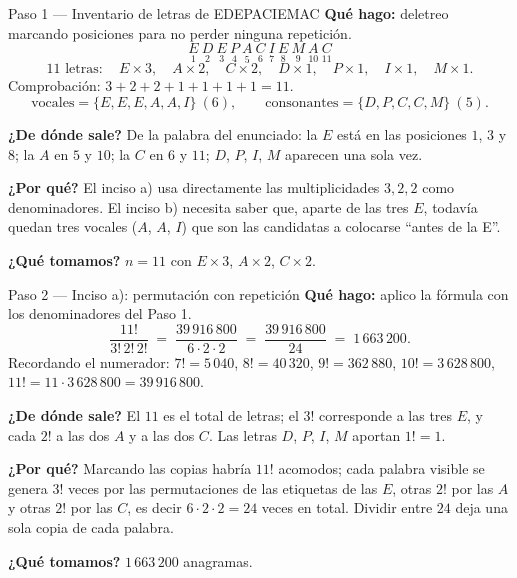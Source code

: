 \documentclass[11pt]{article}
\begin{document}
\begin{paso}{Paso 1 --- Inventario de letras de EDEPACIEMAC}
\textbf{Qué hago:} deletreo marcando posiciones para no perder ninguna repetición.
\[
\underset{1}{E}\ \underset{2}{D}\ \underset{3}{E}\ \underset{4}{P}\ \underset{5}{A}\ \underset{6}{C}\
\underset{7}{I}\ \underset{8}{E}\ \underset{9}{M}\ \underset{10}{A}\ \underset{11}{C}
\]
\[
11 \text{ letras}:\quad E\times 3,\quad A\times 2,\quad C\times 2,\quad D\times 1,\quad P\times 1,\quad
I\times 1,\quad M\times 1 .
\]
Comprobación: $3+2+2+1+1+1+1=11$. \checkmark
\[
\text{vocales} = \{E,E,E,A,A,I\}\ (6),\qquad \text{consonantes} = \{D,P,C,C,M\}\ (5).
\]

\textbf{¿De dónde sale?} De la palabra del enunciado: la $E$ está en las posiciones $1$, $3$ y $8$; la $A$ en
$5$ y $10$; la $C$ en $6$ y $11$; $D$, $P$, $I$, $M$ aparecen una sola vez.

\textbf{¿Por qué?} El inciso a) usa directamente las multiplicidades $3,2,2$ como denominadores. El inciso b)
necesita saber que, aparte de las tres $E$, todavía quedan tres vocales ($A$, $A$, $I$) que son las
candidatas a colocarse ``antes de la E''.

\textbf{¿Qué tomamos?} $n=11$ con $E\times3$, $A\times2$, $C\times2$.
\end{paso}

\begin{paso}{Paso 2 --- Inciso a): permutación con repetición}
\textbf{Qué hago:} aplico la fórmula con los denominadores del Paso 1.
\[
\frac{11!}{3!\,2!\,2!} \;=\; \frac{39\,916\,800}{6\cdot 2\cdot 2} \;=\; \frac{39\,916\,800}{24}
\;=\; 1\,663\,200 .
\]
Recordando el numerador: $7!=5\,040$, $8!=40\,320$, $9!=362\,880$, $10!=3\,628\,800$,
$11!=11\cdot 3\,628\,800=39\,916\,800$.

\textbf{¿De dónde sale?} El $11$ es el total de letras; el $3!$ corresponde a las tres $E$, y cada $2!$ a las
dos $A$ y a las dos $C$. Las letras $D$, $P$, $I$, $M$ aportan $1!=1$.

\textbf{¿Por qué?} Marcando las copias habría $11!$ acomodos; cada palabra visible se genera $3!$ veces por
las permutaciones de las etiquetas de las $E$, otras $2!$ por las $A$ y otras $2!$ por las $C$, es decir
$6\cdot2\cdot2=24$ veces en total. Dividir entre $24$ deja una sola copia de cada palabra.

\textbf{¿Qué tomamos?} $1\,663\,200$ anagramas.
\end{paso}
\end{document}
